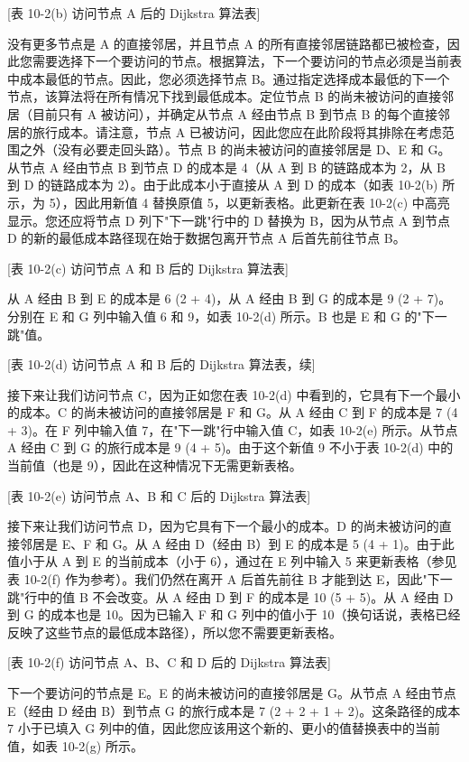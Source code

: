 \documentclass[12pt,a4paper,oneside,UTF8]{ctexart}
\begin{document}
[表 10-2(b) 访问节点 A 后的 Dijkstra 算法表]

没有更多节点是 A 的直接邻居，并且节点 A 的所有直接邻居链路都已被检查，因此您需要选择下一个要访问的节点。根据算法，下一个要访问的节点必须是当前表中成本最低的节点。因此，您必须选择节点 B。通过指定选择成本最低的下一个节点，该算法将在所有情况下找到最低成本。定位节点 B 的尚未被访问的直接邻居（目前只有 A 被访问），并确定从节点 A 经由节点 B 到节点 B 的每个直接邻居的旅行成本。请注意，节点 A 已被访问，因此您应在此阶段将其排除在考虑范围之外（没有必要走回头路）。节点 B 的尚未被访问的直接邻居是 D、E 和 G。从节点 A 经由节点 B 到节点 D 的成本是 4（从 A 到 B 的链路成本为 2，从 B 到 D 的链路成本为 2）。由于此成本小于直接从 A 到 D 的成本（如表 10-2(b) 所示，为 5），因此用新值 4 替换原值 5，以更新表格。此更新在表 10-2(c) 中高亮显示。您还应将节点 D 列下"下一跳"行中的 D 替换为 B，因为从节点 A 到节点 D 的新的最低成本路径现在始于数据包离开节点 A 后首先前往节点 B。

[表 10-2(c) 访问节点 A 和 B 后的 Dijkstra 算法表]

从 A 经由 B 到 E 的成本是 6 (2 + 4)，从 A 经由 B 到 G 的成本是 9 (2 + 7)。分别在 E 和 G 列中输入值 6 和 9，如表 10-2(d) 所示。B 也是 E 和 G 的"下一跳"值。

[表 10-2(d) 访问节点 A 和 B 后的 Dijkstra 算法表，续]

接下来让我们访问节点 C，因为正如您在表 10-2(d) 中看到的，它具有下一个最小的成本。C 的尚未被访问的直接邻居是 F 和 G。从 A 经由 C 到 F 的成本是 7 (4 + 3)。在 F 列中输入值 7，在"下一跳"行中输入值 C，如表 10-2(e) 所示。从节点 A 经由 C 到 G 的旅行成本是 9 (4 + 5)。由于这个新值 9 不小于表 10-2(d) 中的当前值（也是 9），因此在这种情况下无需更新表格。

[表 10-2(e) 访问节点 A、B 和 C 后的 Dijkstra 算法表]

接下来让我们访问节点 D，因为它具有下一个最小的成本。D 的尚未被访问的直接邻居是 E、F 和 G。从 A 经由 D（经由 B）到 E 的成本是 5 (4 + 1)。由于此值小于从 A 到 E 的当前成本（小于 6），通过在 E 列中输入 5 来更新表格（参见表 10-2(f) 作为参考）。我们仍然在离开 A 后首先前往 B 才能到达 E，因此"下一跳"行中的值 B 不会改变。从 A 经由 D 到 F 的成本是 10 (5 + 5)。从 A 经由 D 到 G 的成本也是 10。因为已输入 F 和 G 列中的值小于 10（换句话说，表格已经反映了这些节点的最低成本路径），所以您不需要更新表格。

[表 10-2(f) 访问节点 A、B、C 和 D 后的 Dijkstra 算法表]

下一个要访问的节点是 E。E 的尚未被访问的直接邻居是 G。从节点 A 经由节点 E（经由 D 经由 B）到节点 G 的旅行成本是 7 (2 + 2 + 1 + 2)。这条路径的成本 7 小于已填入 G 列中的值，因此您应该用这个新的、更小的值替换表中的当前值，如表 10-2(g) 所示。
\end{document}

